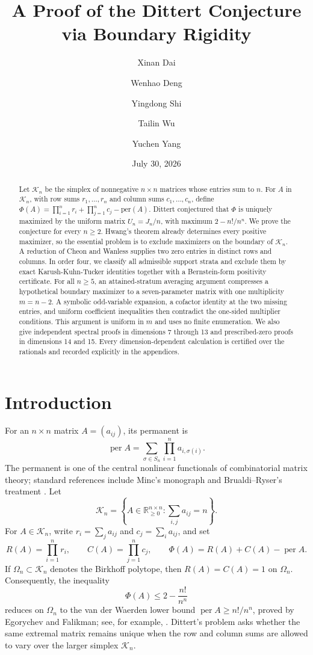 \documentclass[11pt]{amsart}
\title[The Dittert conjecture]{A Proof of the Dittert Conjecture via Boundary Rigidity}
\author{Xinan Dai}
\author{Wenhao Deng}
\author{Yingdong Shi}
\author{Tailin Wu}
\author{Yuchen Yang}
\date{July 30, 2026}
\theoremstyle{definition}
\theoremstyle{remark}
\begin{document}
\begin{abstract}
Let $\mathcal{K}_n$ be the simplex of nonnegative $n \times n$ matrices
whose entries sum to $n$. For $A$ in $\mathcal{K}_n$, with row sums
$r_1,\ldots,r_n$ and column sums $c_1,\ldots,c_n$, define
$\Phi(A)=\prod_{i=1}^n r_i+\prod_{j=1}^n c_j-\mathrm{per}(A)$.
Dittert conjectured that $\Phi$ is uniquely maximized by the uniform
matrix $U_n=J_n/n$, with maximum $2-n!/n^n$. We prove the conjecture for
every $n \geq 2$. Hwang's theorem already determines every positive
maximizer, so the essential problem is to exclude maximizers on the
boundary of $\mathcal{K}_n$. A reduction of Cheon and Wanless supplies two
zero entries in distinct rows and columns. In order four, we classify all
admissible support strata and exclude them by exact Karush-Kuhn-Tucker
identities together with a Bernstein-form positivity certificate. For all
$n \geq 5$, an attained-stratum averaging argument compresses a
hypothetical boundary maximizer to a seven-parameter matrix with one
multiplicity $m=n-2$. A symbolic odd-variable expansion, a cofactor
identity at the two missing entries, and uniform coefficient inequalities
then contradict the one-sided multiplier conditions. This argument is
uniform in $m$ and uses no finite enumeration. We also give independent
spectral proofs in dimensions 7 through 13 and prescribed-zero proofs in
dimensions 14 and 15. Every dimension-dependent calculation is certified
over the rationals and recorded explicitly in the appendices.
\end{abstract}

\maketitle

\section{Introduction}

For an \(n\times n\) matrix \(A=(a_{ij})\), its permanent is
\[
 \operatorname{per}A=\sum_{\sigma\in S_n}
 \prod_{i=1}^n a_{i,\sigma(i)}.
\]
The permanent is one of the central nonlinear functionals of
combinatorial matrix theory; standard references include
Minc's monograph and Brualdi--Ryser's treatment
\cite{Minc78,BrualdiRyser}.  Let
\[
 \mathcal K_n=\left\{A\in\mathbb R_{\geq0}^{n\times n}:
       \sum_{i,j}a_{ij}=n\right\}.
\]
For \(A\in\mathcal K_n\), write \(r_i=\sum_j a_{ij}\) and
\(c_j=\sum_i a_{ij}\), and set
\[
 R(A)=\prod_{i=1}^n r_i,\qquad
 C(A)=\prod_{j=1}^n c_j,\qquad
 \Phi(A)=R(A)+C(A)-\operatorname{per}A.
\]
If \(\Omega_n\subset\mathcal K_n\) denotes the Birkhoff polytope, then
\(R(A)=C(A)=1\) on \(\Omega_n\).  Consequently, the inequality
\[
 \Phi(A)\leq 2-\frac{n!}{n^n}
\]
reduces on \(\Omega_n\) to the van der Waerden lower bound
\(\operatorname{per}A\geq n!/n^n\), proved by
Egorychev and Falikman; see, for example, \cite{Egorychev,Minc78}.
Dittert's problem asks whether the same extremal matrix remains unique
when the row and column sums are allowed to vary over the larger simplex
\(\mathcal K_n\).
\end{document}

